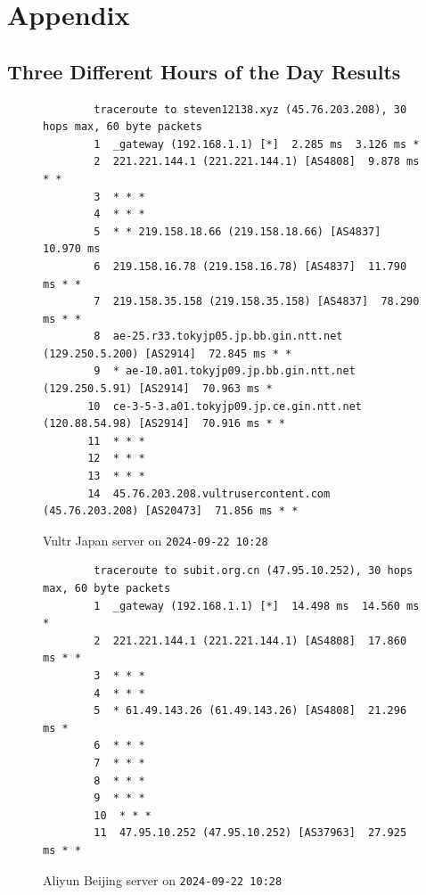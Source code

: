 \documentclass{cshwk}
\begin{document}
\newpage
\section{Appendix}


\subsection{Three Different Hours of the Day Results}
\begin{figure}[H]
    \footnotesize
    \begin{verbatim}
        traceroute to steven12138.xyz (45.76.203.208), 30 hops max, 60 byte packets
        1  _gateway (192.168.1.1) [*]  2.285 ms  3.126 ms *
        2  221.221.144.1 (221.221.144.1) [AS4808]  9.878 ms * *
        3  * * *
        4  * * *
        5  * * 219.158.18.66 (219.158.18.66) [AS4837]  10.970 ms
        6  219.158.16.78 (219.158.16.78) [AS4837]  11.790 ms * *
        7  219.158.35.158 (219.158.35.158) [AS4837]  78.290 ms * *
        8  ae-25.r33.tokyjp05.jp.bb.gin.ntt.net (129.250.5.200) [AS2914]  72.845 ms * *
        9  * ae-10.a01.tokyjp09.jp.bb.gin.ntt.net (129.250.5.91) [AS2914]  70.963 ms *
       10  ce-3-5-3.a01.tokyjp09.jp.ce.gin.ntt.net (120.88.54.98) [AS2914]  70.916 ms * *
       11  * * *
       12  * * *
       13  * * *
       14  45.76.203.208.vultrusercontent.com (45.76.203.208) [AS20473]  71.856 ms * *             
    \end{verbatim}
    \caption{Vultr Japan server on \texttt{2024-09-22 10:28}}
    \label{fig:traceroute1}
\end{figure}

\begin{figure}[H]
    \footnotesize
    \begin{verbatim}
        traceroute to subit.org.cn (47.95.10.252), 30 hops max, 60 byte packets
        1  _gateway (192.168.1.1) [*]  14.498 ms  14.560 ms *
        2  221.221.144.1 (221.221.144.1) [AS4808]  17.860 ms * *
        3  * * *
        4  * * *
        5  * 61.49.143.26 (61.49.143.26) [AS4808]  21.296 ms *
        6  * * *
        7  * * *
        8  * * *
        9  * * *
        10  * * *
        11  47.95.10.252 (47.95.10.252) [AS37963]  27.925 ms * *
    \end{verbatim}
    \caption{Aliyun Beijing server on \texttt{2024-09-22 10:28}}
\end{figure}
\end{document}
